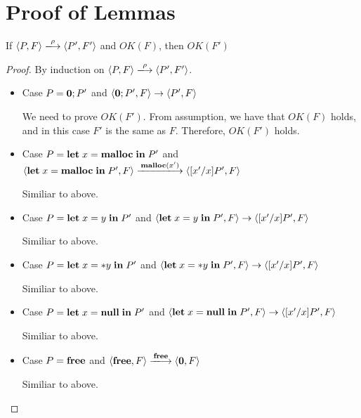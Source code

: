 \section{Proof of Lemmas}
\label{sec:proof}

\begin{lemma}
\label{lem:okFpreserved}
If \( \langle P, F \rangle \xlongrightarrow{\rho} \langle P', F' \rangle\) and \( OK(F)\), then \(OK(F')\)
\end{lemma}

\begin{proof}
By induction on \( \langle P, F \rangle \xlongrightarrow{\rho} \langle P', F' \rangle\).
  \begin{itemize}

  \item Case \( P = {\bf 0};P'\) and \( \langle {\bf 0};P', F \rangle \rightarrow \langle P', F \rangle \)
    
      We need to prove \(OK(F')\). From assumption, we have that
      \(OK(F)\) holds, and in this case \(F'\) is the same as
      \(F\). Therefore, \(OK(F')\) holds.

    \item Case \( P = \mathbf{let}\; x = \mathbf{malloc} \; \mathbf{in}\; P'\) and \( \langle \LET
      x = \Malloc \; \IN P', F \rangle \xlongrightarrow{\Malloc{(x')}}
      \langle [x'/x]P', F \rangle \)

      Similiar to above.

    \item Case \( P = \mathbf{let}\; x = y \; \mathbf{in}\; P'\) and \( \langle \mathbf{let}\; x = y
      \; \mathbf{in}\; P', F \rangle \rightarrow \langle [x'/x]P', F \rangle \)

      Similiar to above.

    \item Case \( P = \mathbf{let}\; x = *y \; \mathbf{in}\; P'\) and \( \langle \mathbf{let}\; x = *y
      \; \mathbf{in}\; P', F \rangle \rightarrow \langle [x'/x]P', F \rangle \)

      Similiar to above.

    \item Case \( P = \mathbf{let}\; x = \mathbf{null} \; \mathbf{in}\; P'\) and \( \langle \mathbf{let}\; x
      = \mathbf{null} \; \mathbf{in}\; P', F \rangle \rightarrow \langle [x'/x]P', F
      \rangle \)

      Similiar to above.

    \item Case \( P = \mathbf{free}\) and \( \langle \Free, F \rangle \xlongrightarrow{\Free} \langle {\bf 0}, F \rangle \)

      Similiar to above.


\end{itemize}
\end{proof}

